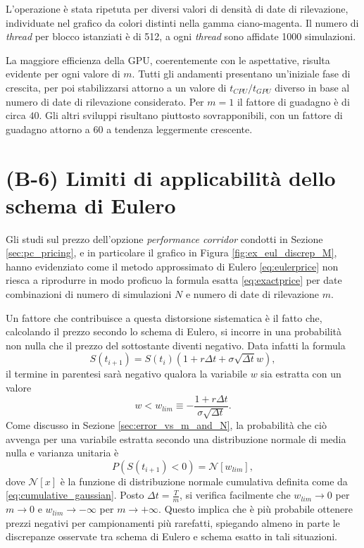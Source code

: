 L'operazione è stata ripetuta per diversi valori di densità di date di rilevazione, individuate nel grafico da colori distinti nella gamma ciano-magenta. Il numero di \textit{thread} per blocco istanziati è di 512, a ogni \textit{thread} sono affidate 1000 simulazioni. 

La maggiore efficienza della GPU, coerentemente con le aspettative, risulta evidente per ogni valore di $m$. Tutti gli andamenti presentano un'iniziale fase di crescita, per poi stabilizzarsi attorno a un valore di $t_{CPU}/t_{GPU}$ diverso in base al numero di date di rilevazione considerato. Per $m=1$ il fattore di guadagno è di circa $40$. Gli altri sviluppi risultano piuttosto sovrapponibili, con un fattore di guadagno attorno a $60$ a tendenza leggermente crescente.

\section{(B-6) Limiti di applicabilità dello schema di Eulero} \label{sec:limits}

Gli studi sul prezzo dell'opzione \textit{performance corridor} condotti in Sezione \ref{sec:pc_pricing}, e in particolare il grafico in Figura \ref{fig:ex_eul_discrep_M}, hanno evidenziato come il metodo approssimato di Eulero \eqref{eq:eulerprice} non riesca a riprodurre in modo proficuo la formula esatta \eqref{eq:exactprice} per date combinazioni di numero di simulazioni $N$ e numero di date di rilevazione $m$.

Un fattore che contribuisce a questa distorsione sistematica è il fatto che, calcolando il prezzo secondo lo schema di Eulero, si incorre in una probabilità non nulla che il prezzo del sottostante diventi negativo. Data infatti la formula
\begin{equation}
    S(t_{i+1}) = S(t_i) \left(1 + r \Delta t + \sigma \sqrt{\Delta t} w\right),
    \label{eulerprice_repeat}
\end{equation}
il termine in parentesi sarà negativo qualora la variabile $w$ sia estratta con un valore
\begin{equation}
    w < w_{lim} \equiv - \frac{1+r \Delta t}{\sigma \sqrt{\Delta t}}.
\end{equation}
Come discusso in Sezione \ref{sec:error_vs_m_and_N}, la probabilità che ciò avvenga per una variabile estratta secondo una distribuzione normale di media nulla e varianza unitaria è
\begin{equation}
    P\left(S(t_{i+1})<0\right) = \mathcal{N}\left[w_{lim} \right],
    \label{eq:probability_negativeprice}
\end{equation}
dove $\mathcal{N}[x]$ è la funzione di distribuzione normale cumulativa definita come da \eqref{eq:cumulative_gaussian}. Posto $\Delta t = \frac{T}{m}$, si verifica facilmente che $w_{lim} \rightarrow 0$ per $m \rightarrow 0$ e $w_{lim} \rightarrow -\infty$ per $m \rightarrow +\infty$. Questo implica che è più probabile ottenere prezzi negativi per campionamenti più rarefatti, spiegando almeno in parte le discrepanze osservate tra schema di Eulero e schema esatto in tali situazioni.

